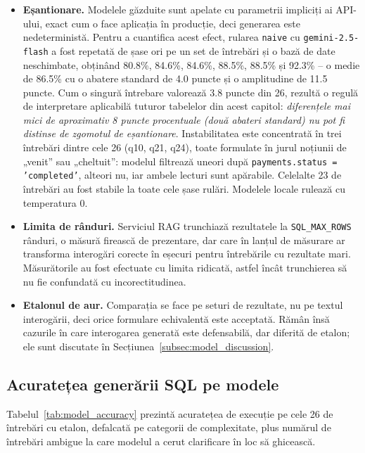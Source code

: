 \documentclass[12pt, a4paper]{report}
\newcommand{\code}[1]{\texttt{#1}}
\begin{document}
\begin{itemize}[nosep]
  \item \textbf{Eșantionare.} Modelele găzduite sunt apelate cu parametrii
    impliciți ai API-ului, exact cum o face aplicația în producție, deci
    generarea este nedeterministă. Pentru a cuantifica acest efect, rularea
    \code{naive} cu \code{gemini-2.5-flash} a fost repetată de șase ori pe un
    set de întrebări și o bază de date neschimbate, obținând 80.8\%, 84.6\%,
    84.6\%, 88.5\%, 88.5\% și 92.3\% -- o medie de 86.5\% cu o abatere
    standard de 4.0 puncte și o amplitudine de 11.5 puncte. Cum o singură
    întrebare valorează 3.8 puncte din 26, rezultă o regulă de interpretare
    aplicabilă tuturor tabelelor din acest capitol: \emph{diferențele mai mici
    de aproximativ 8 puncte procentuale (două abateri standard) nu pot fi
    distinse de zgomotul de eșantionare}. Instabilitatea este concentrată în
    trei întrebări dintre cele 26 (q10, q21, q24), toate formulate în jurul
    noțiunii de „venit'' sau „cheltuit'': modelul filtrează uneori după
    \code{payments.status = 'completed'}, alteori nu, iar ambele lecturi sunt
    apărabile. Celelalte 23 de întrebări au fost stabile la toate cele șase
    rulări. Modelele locale rulează cu temperatura 0.
  \item \textbf{Limita de rânduri.} Serviciul RAG trunchiază rezultatele la
    \code{SQL\_MAX\_ROWS} rânduri, o măsură firească de prezentare, dar care în
    lanțul de măsurare ar transforma interogări corecte în eșecuri pentru
    întrebările cu rezultate mari. Măsurătorile au fost efectuate cu limita
    ridicată, astfel încât trunchierea să nu fie confundată cu incorectitudinea.
  \item \textbf{Etalonul de aur.} Comparația se face pe seturi de rezultate, nu
    pe textul interogării, deci orice formulare echivalentă este acceptată. Rămân
    însă cazurile în care interogarea generată este defensabilă, dar diferită de
    etalon; ele sunt discutate în Secțiunea~\ref{subsec:model_discussion}.
\end{itemize}

\subsection{Acuratețea generării SQL pe modele}

Tabelul~\ref{tab:model_accuracy} prezintă acuratețea de execuție pe cele 26 de
întrebări cu etalon, defalcată pe categorii de complexitate, plus numărul de
întrebări ambigue la care modelul a cerut clarificare în loc să ghicească.
\end{document}
